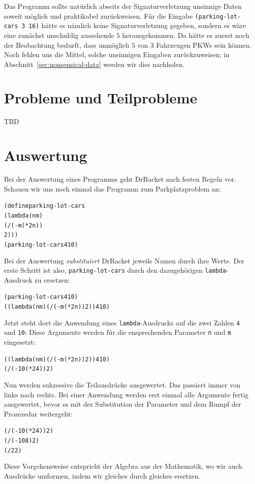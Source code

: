 Das Programm sollte natürlich abseits der Signaturverletzung unsinnige
Daten soweit möglich und praktikabel zurückweisen.  Für die Eingabe
\texttt{(parking-lot-cars 3 16)} hätte es nämlich keine Signaturverletzung
gegeben, sondern es wäre eine zunächst unschuldig aussehende $5$
herausgekommen. Da hätte es zuerst noch der Beobachtung bedurft, dass unmöglich
$5$ von $3$ Fahrzeugen PKWs sein können. Noch fehlen uns
die Mittel, solche unsinnigen Eingaben zurückzuweisen; in Abschnitt~\ref{sec:nonsensical-data} werden wir
dies nachholen.

\section{Probleme und Teilprobleme}
\label{sec:subproblems}

TBD

\section{Auswertung}
\label{sec:substitution-model}
\label{sec:scheme-anatomy}

Bei der Auswertung eines Programms geht DrRacket nach festen Regeln
vor.  Schauen wir uns noch einmal das Programm zum Parkplatzproblem
an:
%
\begin{alltt}
(define parking-lot-cars
  (lambda (n m)
    (/ (- m (* 2 n))
       2)))
(parking-lot-cars 4 10)
\end{alltt}
%
Bei der Auswertung \textit{substituiert} DrRacket
jeweils Namen durch ihre Werte.  Der erste Schritt ist also,
\texttt{parking-lot-cars} durch den dazugehörigen
\texttt{lambda}-Ausdruck zu ersetzen:
%
\begin{alltt}
(parking-lot-cars 4 10)
\evalsto
((lambda (n m) (/ (- m (* 2 n)) 2)) 4 10)
\end{alltt}
%
Jetzt steht dort die Anwendung eines \texttt{lambda}-Ausdrucks auf die
zwei Zahlen \texttt{4} und \texttt{10}: Diese Argumente werden für die
ensprechenden Parameter \texttt{n} und \texttt{m} eingesetzt:
%
\begin{alltt}
((lambda (n m) (/ (- m (* 2 n)) 2)) 4 10)
\evalsto
(/ (- 10 (* 2 4)) 2)
\end{alltt}
%
Nun werden sukzessive die Teilausdrücke ausgewertet.  Das passiert
immer von links nach rechts.  Bei einer Anwendung werden erst einmal
alle Argumente fertig ausgewertet, bevor es mit der Substitution der
Parameter und dem Rumpf der Prozezedur weitergeht:
%
\begin{alltt}
(/ (- 10 (* 2 4)) 2)
\evalsto
(/ (- 10 8) 2)
\evalsto
(/ 2 2)
\end{alltt}
%
Diese Vorgehensweise entspricht der Algebra aus der Mathematik, wo wir
auch Ausdrücke umformen, indem wir gleiches durch gleiches ersetzen.

